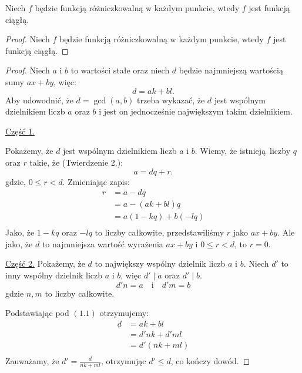 \begin{example}
  Niech $f$ będzie funkcją różniczkowalną w każdym punkcie,  
  wtedy $f$ jest funkcją ciągłą.
\end{example}

\begin{proof}
  Niech $f$ będzie funkcją różniczkowalną w każdym punkcie,  
  wtedy $f$ jest funkcją ciągłą.
\end{proof}

\begin{proof}
  Niech $a$ i $b$ to wartości stałe
  oraz niech $d$ będzie najmniejszą wartością
  sumy $ax + by$, więc:
  \begin{equation}
    d = ak + bl.
  \end{equation}
  Aby udowodnić, że $d = \gcd(a, b)$ trzeba wykazać,
  że $d$ jest wspólnym dzielnikiem liczb $a$ oraz $b$
  i jest on jednocześnie największym takim dzielnikiem.

  \vspace{1em}

  \noindent\underline{Część 1.}

  Pokażemy, że $d$ jest wspólnym dzielnikiem liczb $a$ i $b$.
  Wiemy, że istnieją liczby $q$ oraz $r$ takie, że (Twierdzenie 2.):
  \[
    a = dq + r
  .\]
  gdzie, $0 \leq r < d$. Zmieniając zapis:
  \begin{align*}
    r &= a - dq \\ %
      &= a - (ak + bl)q \\
      &= a(1 - kq) + b(-lq) \\
  \end{align*}
  Jako, że $1 - kq$ oraz  $-lq$ to liczby całkowite, przedstawiliśmy
  $r$ jako $ax + by$. Ale jako, że $d$ to najmniejsza wartość wyrażenia
  $ax + by$ i $0 \leq r < d$, to $r = 0$.

  \vspace{1em}

  \noindent\underline{Część 2.}
  Pokażemy, że $d$ to największy wspólny dzielnik liczb $a$ i $b$.
  Niech $d'$ to inny wspólny dzielnik liczb $a$ i $b$, więc
  $d' \mid a$ oraz $d' \mid b$.
  \[
    d'n = a \quad \mathrm{i} \quad d'm = b
  \]
  gdzie $n, m$ to liczby całkowite.

  Podstawiając pod  $(1.1)$ otrzymujemy:
  \begin{align*}
    d &= ak + bl \\
      &= d'nk + d'ml \\
      &= d'(nk + ml) \\
  \end{align*}
  Zauważamy, że $d' = \frac{d}{nk + ml}$, otrzymując $d' \leq d$, co kończy dowód.
\end{proof}
